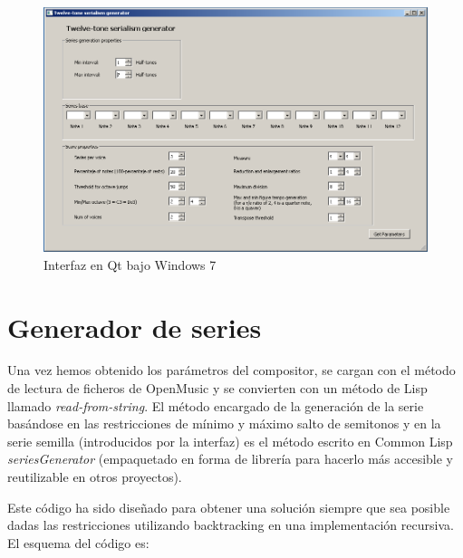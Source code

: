 \documentclass[a4paper,openright,12pt]{book}
\begin{document}
\begin{figure}
\centering
\includegraphics[width=\textwidth]{img/qtprogram.png}
\caption{Interfaz en Qt bajo Windows 7} \label{fig:qtinterface}
\end{figure}

\section{Generador de series}
Una vez hemos obtenido los parámetros del compositor, se cargan con el método de lectura de ficheros de OpenMusic y se convierten con un método de Lisp llamado \emph{read-from-string}. El método encargado de la generación de la serie basándose en las restricciones de mínimo y máximo salto de semitonos y en la serie semilla (introducidos por la interfaz) es el método escrito en Common Lisp \emph{seriesGenerator} (empaquetado en forma de librería para hacerlo más accesible y reutilizable en otros proyectos).

Este código ha sido diseñado para obtener una solución siempre que sea posible dadas las restricciones utilizando backtracking en una implementación recursiva. El esquema del código es:
\end{document}
